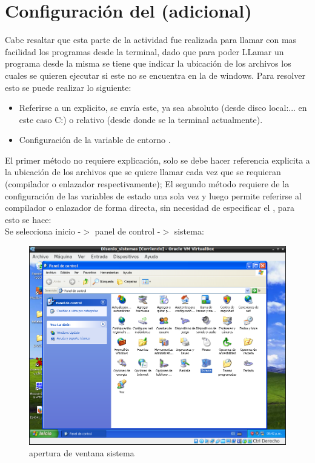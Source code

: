 \section*{Configuración del (adicional)}
  Cabe resaltar que esta parte de la actividad fue realizada para llamar con mas facilidad los programas desde la terminal, dado que   para poder LLamar un programa desde la misma se tiene que indicar la ubicación de los archivos los cuales se quieren ejecutar si este no se encuentra en la   de windows. Para resolver esto se puede realizar lo siguiente:
  \begin{itemize}
    \item  Referirse a un  explicito, se envía este, ya sea absoluto (desde disco local:... en este caso C:) o relativo (desde donde se  la terminal actualmente).

    \item Configuración de la variable de entorno .
  \end{itemize}

  El primer método no requiere explicación, solo se debe hacer referencia explicita a la ubicación de los archivos que se quiere llamar cada vez que se requieran (compilador o enlazador respectivamente); El segundo método requiere de la configuración de las variables de estado una sola vez y luego permite referirse al compilador o enlazador de forma directa, sin necesidad de especificar el , para esto se hace:\\

  Se selecciona inicio -$>$ panel de control -$>$ sistema:

\begin{figure}[H]
  \includegraphics[width=\linewidth]{practica2/imagenes/path/1.png}
  \caption{apertura de ventana sistema}
\end{figure}

